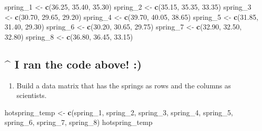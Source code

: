 \documentclass[
]{article}
\newenvironment{Shaded}{\begin{snugshade}}{\end{snugshade}}
\newcommand{\FloatTok}[1]{\textcolor[rgb]{0.00,0.00,0.81}{#1}}
\newcommand{\FunctionTok}[1]{\textcolor[rgb]{0.13,0.29,0.53}{\textbf{#1}}}
\newcommand{\NormalTok}[1]{#1}
\newcommand{\OtherTok}[1]{\textcolor[rgb]{0.56,0.35,0.01}{#1}}
\providecommand{\tightlist}{%
  \setlength{\itemsep}{0pt}\setlength{\parskip}{0pt}}
\begin{document}
\begin{Shaded}
\begin{Highlighting}[]
\NormalTok{spring\_1 }\OtherTok{\textless{}{-}} \FunctionTok{c}\NormalTok{(}\FloatTok{36.25}\NormalTok{, }\FloatTok{35.40}\NormalTok{, }\FloatTok{35.30}\NormalTok{)}
\NormalTok{spring\_2 }\OtherTok{\textless{}{-}} \FunctionTok{c}\NormalTok{(}\FloatTok{35.15}\NormalTok{, }\FloatTok{35.35}\NormalTok{, }\FloatTok{33.35}\NormalTok{)}
\NormalTok{spring\_3 }\OtherTok{\textless{}{-}} \FunctionTok{c}\NormalTok{(}\FloatTok{30.70}\NormalTok{, }\FloatTok{29.65}\NormalTok{, }\FloatTok{29.20}\NormalTok{)}
\NormalTok{spring\_4 }\OtherTok{\textless{}{-}} \FunctionTok{c}\NormalTok{(}\FloatTok{39.70}\NormalTok{, }\FloatTok{40.05}\NormalTok{, }\FloatTok{38.65}\NormalTok{)}
\NormalTok{spring\_5 }\OtherTok{\textless{}{-}} \FunctionTok{c}\NormalTok{(}\FloatTok{31.85}\NormalTok{, }\FloatTok{31.40}\NormalTok{, }\FloatTok{29.30}\NormalTok{)}
\NormalTok{spring\_6 }\OtherTok{\textless{}{-}} \FunctionTok{c}\NormalTok{(}\FloatTok{30.20}\NormalTok{, }\FloatTok{30.65}\NormalTok{, }\FloatTok{29.75}\NormalTok{)}
\NormalTok{spring\_7 }\OtherTok{\textless{}{-}} \FunctionTok{c}\NormalTok{(}\FloatTok{32.90}\NormalTok{, }\FloatTok{32.50}\NormalTok{, }\FloatTok{32.80}\NormalTok{)}
\NormalTok{spring\_8 }\OtherTok{\textless{}{-}} \FunctionTok{c}\NormalTok{(}\FloatTok{36.80}\NormalTok{, }\FloatTok{36.45}\NormalTok{, }\FloatTok{33.15}\NormalTok{)}
\end{Highlighting}
\end{Shaded}

\hypertarget{i-ran-the-code-above}{%
\subsection{\^{} I ran the code above! :)}\label{i-ran-the-code-above}}

\begin{enumerate}
\def\labelenumi{\arabic{enumi}.}
\setcounter{enumi}{3}
\tightlist
\item
  Build a data matrix that has the springs as rows and the columns as
  scientists.
\end{enumerate}

\begin{Shaded}
\begin{Highlighting}[]
\NormalTok{hotspring\_temp }\OtherTok{\textless{}{-}} \FunctionTok{c}\NormalTok{(spring\_1, spring\_2, spring\_3, spring\_4, spring\_5, spring\_6, spring\_7, spring\_8)}
\NormalTok{hotspring\_temp}
\end{Highlighting}
\end{Shaded}
\end{document}
